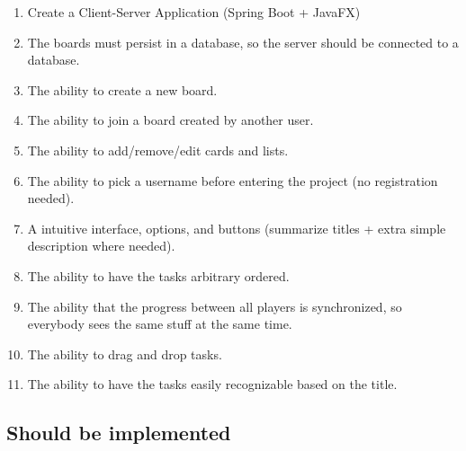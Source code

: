 \documentclass{article}
\begin{document}
	\begin{enumerate}
		\item Create a Client-Server Application (Spring Boot + JavaFX)
		\item The boards must persist in a database, so the server should be connected to a database.
		\item The ability to create a new board.
		\item The ability to join a board created by another user.
		\item The ability to add/remove/edit cards and lists.
		\item The ability to pick a username before entering the project (no registration needed).
		\item A intuitive interface, options, and buttons (summarize titles + extra simple description where needed).
		\item The ability to have the tasks arbitrary ordered.
		\item The ability that the progress between all players is synchronized, so everybody sees the same stuff at the same time.
		\item The ability to drag and drop tasks.
		\item The ability to have the tasks easily recognizable based on the title.
	\end{enumerate}

	\subsection{Should be implemented}
\end{document}
